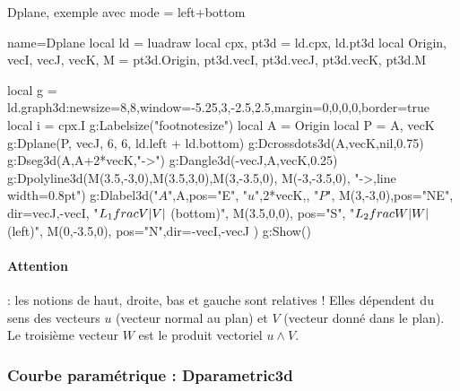 \begin{demo}{Dplane, exemple avec mode = left+bottom}
\begin{luadraw}{name=Dplane}
local ld = luadraw
local cpx, pt3d = ld.cpx, ld.pt3d
local Origin, vecI, vecJ, vecK, M = pt3d.Origin, pt3d.vecI, pt3d.vecJ, pt3d.vecK, pt3d.M

local g = ld.graph3d:new{size={8,8},window={-5.25,3,-2.5,2.5},margin={0,0,0,0},border=true}
local i = cpx.I
g:Labelsize("footnotesize")
local A = Origin
local P = {A, vecK}
g:Dplane(P, vecJ, 6, 6, ld.left + ld.bottom)
g:Dcrossdots3d({A,vecK},nil,0.75)
g:Dseg3d({A,A+2*vecK},"->")
g:Dangle3d(-vecJ,A,vecK,0.25)
g:Dpolyline3d({{M(3.5,-3,0),M(3.5,3,0)},{M(3,-3.5,0), M(-3,-3.5,0)}}, "->,line width=0.8pt")
g:Dlabel3d("$A$",A,{pos="E"},
    "$u$",2*vecK,{},
    "$P$", M(3,-3,0),{pos="NE", dir={vecJ,-vecI}},
    "$L_1\\frac{V}{\\|V\\|}$ (bottom)", M(3.5,0,0), {pos="S"},
    "$L_2\\frac{W}{\\|W\\|}$ (left)", M(0,-3.5,0), {pos="N",dir={-vecI,-vecJ}}
)
g:Show()
\end{luadraw}
\end{demo}

\paragraph{Attention} : les notions de haut, droite, bas et gauche sont relatives ! Elles dépendent du sens des vecteurs $u$ (vecteur normal au plan) et $V$ (vecteur donné dans le plan). Le troisième vecteur $W$ est le produit vectoriel $u\wedge V$.

\subsubsection{Courbe paramétrique : Dparametric3d}

